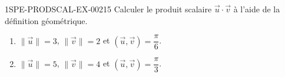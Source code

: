 \begin{exercice}{1SPE-PRODSCAL-EX-002}{1}{5}
Calculer le produit scalaire $\vec{u} \cdot \vec{v}$ à l'aide de la définition géométrique.
\begin{enumerate}
  \item $\|\vec{u}\| = 3$, $\|\vec{v}\| = 2$ et $(\vec{u}, \vec{v}) = \dfrac{\pi}{6}$.
  \item $\|\vec{u}\| = 5$, $\|\vec{v}\| = 4$ et $(\vec{u}, \vec{v}) = \dfrac{\pi}{3}$.
\end{enumerate}
\end{exercice}
